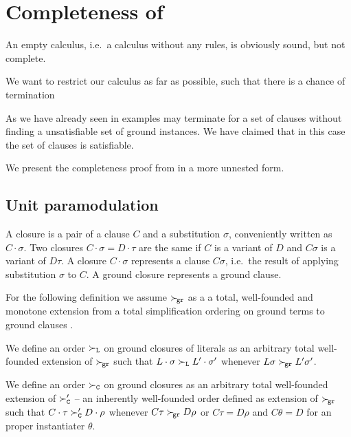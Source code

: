 
\chapter{Completeness of \InstGenEQ}

An empty calculus,
i.e.~a calculus without any rules,
is obviously sound, but not complete.


We want to restrict our calculus as far as possible,
such that there is a chance of termination

As we have already seen in examples \InstGenEQ
may terminate for a set of clauses without finding
a unsatisfiable set of ground instances.
We have claimed that in this case the set of clauses is satisfiable.



We present the completeness proof from \cite{GK2004csl} in a more unnested form.


\section{Unit paramodulation}\label{sec:unit:paramodulation}

\begin{definition}
    A closure is a pair of a clause $C$ and a substitution $\sigma$,
    conveniently written as $C\cdot\sigma$. Two closures $C\cdot\sigma = D\cdot\tau$
    are the same if $C$ is a variant of $D$ and $C\sigma$ is a variant of $D\tau$.
    A closure $C\cdot\sigma$ represents a clause $C\sigma$,
    i.e.~the result of applying substitution $\sigma$ to $C$.
    A ground closure represents a ground clause.
\end{definition}

For the following definition we assume
$\mathrel\succ_{\!\mathtt{gr}}$ as a a total, well-founded and monotone extension
from a total simplification ordering on ground terms
to ground clauses \cite{NR2001}.

\begin{definition}
    We define an order $\mathrel\succ_{\mathtt{L}}$ on ground closures of literals
    as an arbitrary total well-founded extension of $\mathrel\succ_{\!\mathtt{gr}}$
    such that
    $L\cdot\sigma\mathrel\succ_{\mathtt{L}} L'\cdot\sigma'$ whenever
    $L\sigma\mathrel\succ_{\!\mathtt{gr}} L'\sigma'$.

    We define an order \( \mathrel\succ_{\mathtt{C}} \) on ground closures
    as an arbitrary total well-founded extension of
    $\mathrel\succ_{\mathtt{C}}'$ -- an inherently well-founded order defined as extension of $\mathrel\succ_{\!\mathtt{gr}}$
    such that
    $C\cdot\tau\mathrel\succ_{\mathtt{C}}' D\cdot\rho$ whenever
    $C\tau\mathrel\succ_{\!\mathtt{gr}} D\rho$ or $C\tau = D\rho$ and $C\theta = D$ for an proper instantiater $\theta$.
\end{definition}

